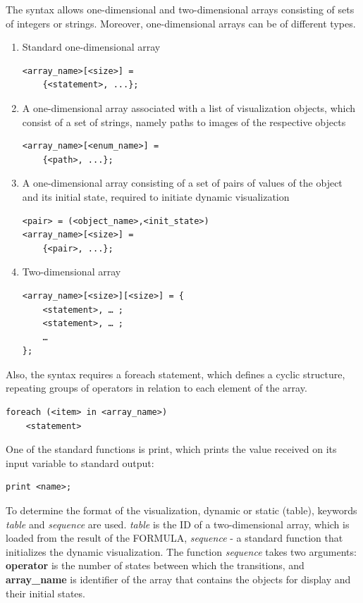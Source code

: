 \documentclass[a4paper, 10pt, conference]{ieeeconf}
\begin{document}
The syntax allows one-dimensional and two-dimensional arrays consisting of sets of integers or strings. Moreover, one-dimensional arrays can be of different types.\\
\begin{enumerate}
\item Standard one-dimensional array
\begin{lstlisting}
<array_name>[<size>] = 
	{<statement>, ...};
\end{lstlisting}
\item A one-dimensional array associated with a list of visualization objects, which consist of a set of strings, namely paths to images of the respective objects
\begin{lstlisting}
<array_name>[<enum_name>] = 
	{<path>, ...};
\end{lstlisting}
\item A one-dimensional array consisting of a set of pairs of values of the object and its initial state, required to initiate dynamic visualization
\begin{lstlisting}
<pair> = (<object_name>,<init_state>)
<array_name>[<size>] = 
	{<pair>, ...};
\end{lstlisting}
\item Two-dimensional array
\begin{lstlisting}
<array_name>[<size>][<size>] = {
	<statement>, … ;
	<statement>, … ;
	…
};
\end{lstlisting}
\end{enumerate}
Also, the syntax requires a foreach statement, which defines a cyclic structure, repeating groups of operators in relation to each element of the array.
\begin{lstlisting}
foreach (<item> in <array_name>)
	<statement>
\end{lstlisting}
One of the standard functions is print, which prints the value received on its input variable to standard output:
\begin{lstlisting}
print <name>;
\end{lstlisting}
To determine the format of the visualization, dynamic or static (table), keywords \textit{table} and \textit{sequence} are used. \textit{table} is the ID of a two-dimensional array, which is loaded from the result of the FORMULA, \textit{sequence} - a standard function that initializes the dynamic visualization.
The function \textit{sequence} takes two arguments:
\textbf{operator} is the number of states between which the transitions, and \textbf{array\_name} is identifier of the array that contains the objects for display and their initial states.
\end{document}
